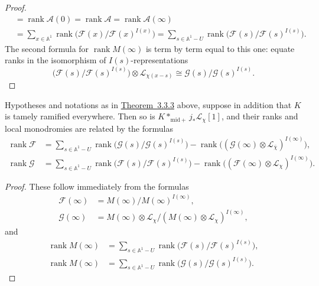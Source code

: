 \begin{proof}
\[\begin{aligned}
  &=
  \operatorname{rank}\mathcal{A}(0)
  =
  \operatorname{rank}\mathcal{A}
  =
  \operatorname{rank}\mathcal{A}(\infty)\\
  &=
  \sum_{x\in\mathbb{A}^1}
  \operatorname{rank}\bigl(\mathcal{F}(x)/\mathcal{F}(x)^{I(x)}\bigr)
  =
  \sum_{s\in\mathbb{A}^1-U}
  \operatorname{rank}\bigl(\mathcal{F}(s)/\mathcal{F}(s)^{I(s)}\bigr).
\end{aligned}
\]
The second formula for \(\operatorname{rank}M(\infty)\) is term by term equal
to this one: equate ranks in the isomorphism of \(I(s)\)-representations
\[
  \bigl(\mathcal{F}(s)/\mathcal{F}(s)^{I(s)}\bigr)
  \otimes\mathcal{L}_{\chi(x-s)}
  \cong
  \mathcal{G}(s)/\mathcal{G}(s)^{I(s)}.
\]
\end{proof}

Hypotheses and notations as in \hyperref[thm:3.3.3]{Theorem~3.3.3} above,
suppose in addition that \(K\) is tamely ramified everywhere. Then so is
\(K*_{\mathrm{mid}+}j_*\mathcal{L}_{\chi}[1]\), and their ranks and local
monodromies are related by the formulas
\[
\begin{aligned}
  \operatorname{rank}\mathcal{F}
  &=
  \sum_{s\in\mathbb{A}^1-U}
  \operatorname{rank}\bigl(\mathcal{G}(s)/\mathcal{G}(s)^{I(s)}\bigr)
  -
  \operatorname{rank}\bigl((\mathcal{G}(\infty)\otimes
  \mathcal{L}_{\overline{\chi}})^{I(\infty)}\bigr),\\
  \operatorname{rank}\mathcal{G}
  &=
  \sum_{s\in\mathbb{A}^1-U}
  \operatorname{rank}\bigl(\mathcal{F}(s)/\mathcal{F}(s)^{I(s)}\bigr)
  -
  \operatorname{rank}\bigl((\mathcal{F}(\infty)\otimes
  \mathcal{L}_{\chi})^{I(\infty)}\bigr).
\end{aligned}
\]

\begin{proof}
These follow immediately from the formulas
\[
\begin{aligned}
  \mathcal{F}(\infty)&=M(\infty)/M(\infty)^{I(\infty)},\\
  \mathcal{G}(\infty)&=
  M(\infty)\otimes\mathcal{L}_{\chi}/
  (M(\infty)\otimes\mathcal{L}_{\chi})^{I(\infty)},
\end{aligned}
\]
and
\[
\begin{aligned}
  \operatorname{rank}M(\infty)
  &=
  \sum_{s\in\mathbb{A}^1-U}
  \operatorname{rank}\bigl(\mathcal{F}(s)/\mathcal{F}(s)^{I(s)}\bigr),\\
  \operatorname{rank}M(\infty)
  &=
  \sum_{s\in\mathbb{A}^1-U}
  \operatorname{rank}\bigl(\mathcal{G}(s)/\mathcal{G}(s)^{I(s)}\bigr).
\end{aligned}
\]
\end{proof}

